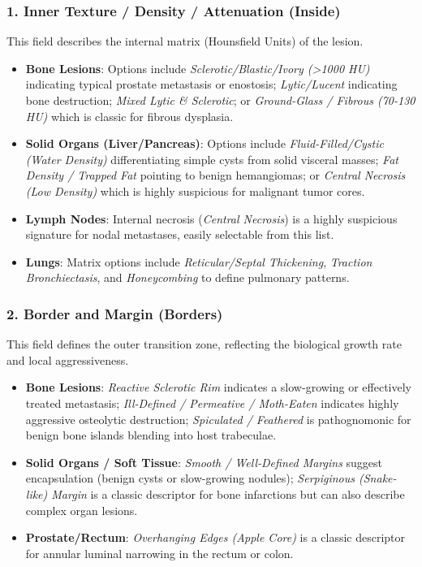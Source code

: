 \documentclass[a4paper,10pt]{article}
\begin{document}
\subsubsection{1. Inner Texture / Density / Attenuation (Inside)}
This field describes the internal matrix (Hounsfield Units) of the lesion.
\begin{itemize}
    \item \textbf{Bone Lesions}: Options include \textit{Sclerotic/Blastic/Ivory (>1000 HU)} indicating typical prostate metastasis or enostosis; \textit{Lytic/Lucent} indicating bone destruction; \textit{Mixed Lytic \& Sclerotic}; or \textit{Ground-Glass / Fibrous (70-130 HU)} which is classic for fibrous dysplasia.
    \item \textbf{Solid Organs (Liver/Pancreas)}: Options include \textit{Fluid-Filled/Cystic (Water Density)} differentiating simple cysts from solid visceral masses; \textit{Fat Density / Trapped Fat} pointing to benign hemangiomas; or \textit{Central Necrosis (Low Density)} which is highly suspicious for malignant tumor cores.
    \item \textbf{Lymph Nodes}: Internal necrosis (\textit{Central Necrosis}) is a highly suspicious signature for nodal metastases, easily selectable from this list.
    \item \textbf{Lungs}: Matrix options include \textit{Reticular/Septal Thickening}, \textit{Traction Bronchiectasis}, and \textit{Honeycombing} to define pulmonary patterns.
\end{itemize}

\subsubsection{2. Border and Margin (Borders)}
This field defines the outer transition zone, reflecting the biological growth rate and local aggressiveness.
\begin{itemize}
    \item \textbf{Bone Lesions}: \textit{Reactive Sclerotic Rim} indicates a slow-growing or effectively treated metastasis; \textit{Ill-Defined / Permeative / Moth-Eaten} indicates highly aggressive osteolytic destruction; \textit{Spiculated / Feathered} is pathognomonic for benign bone islands blending into host trabeculae.
    \item \textbf{Solid Organs / Soft Tissue}: \textit{Smooth / Well-Defined Margins} suggest encapsulation (benign cysts or slow-growing nodules); \textit{Serpiginous (Snake-like) Margin} is a classic descriptor for bone infarctions but can also describe complex organ lesions.
    \item \textbf{Prostate/Rectum}: \textit{Overhanging Edges (Apple Core)} is a classic descriptor for annular luminal narrowing in the rectum or colon.
\end{itemize}
\end{document}
